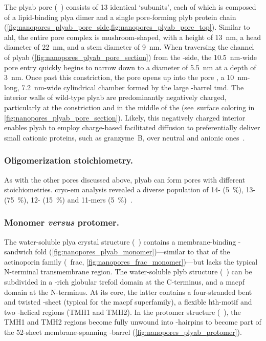 The \gls{plyab} pore (~\cite{Lukoyanova-Kondos-2015}) consists of 13 identical `subunits', each of
which is composed of a lipid-binding \gls{plya} dimer and a single pore-forming \gls{plyb} protein chain
(\cref{fig:nanopores_plyab_pore_side,fig:nanopores_plyab_pore_top}). Similar to \gls{ahl}, the entire pore
complex is mushroom-shaped, with a height of \SI{13}{\nm}, a head diameter of \SI{22}{\nm}, and a stem
diameter of \SI{9}{\nm}. When traversing the channel of \gls{plyab} (\cref{fig:nanopores_plyab_pore_section})
from the \cisi{}-side, the \SI{10.5}{\nm}-wide pore entry quickly begins to narrow down to a diameter of
\SI{5.5}{\nm} at a depth of \SI{3}{\nm}. Once past this constriction, the pore opens up into the pore
\lumen{}, a \SI{10}{\nm}-long, \SI{7.2}{\nm}-wide cylindrical chamber formed by the large \tb-barrel
\gls{tmd}. The interior walls of wild-type \gls{plyab} are predominantly negatively charged, particularly at
the constriction and in the middle of the \lumen{} (see~surface coloring in
\cref{fig:nanopores_plyab_pore_section}). Likely, this negatively charged interior enables \gls{plyab} to
employ charge-based facilitated diffusion to preferentially deliver small cationic proteins, such as
granzyme~B, over neutral and anionic ones~\cite{Stewart-2014,Reboul-2016}.


\subsubsection{Oligomerization stoichiometry.}
%

As with the other pores discussed above, \gls{plyab} can form pores with different stoichiometries.
\Gls{cryo-em} analysis revealed a diverse population of 14- (\SI{5}{\percent}), 13- (\SI{75}{\percent}), 12-
(\SI{15}{\percent}) and 11-mers (\SI{5}{\percent})~\cite{Lukoyanova-Kondos-2015}.


\subsubsection{Monomer \textit{versus} protomer.}
%

The water-soluble \gls{plya} crystal structure (~\cite{Lukoyanova-Kondos-2015}) contains a
membrane-binding \tb-sandwich fold (\cref{fig:nanopores_plyab_monomer})---similar to that of the actinoporin
family (\eg~\gls{frac}, \cref{fig:nanopores_frac_monomer})---but lacks the typical N-terminal transmembrane
region. The water-soluble \gls{plyb} structure (~\cite{Lukoyanova-Kondos-2015}) can be subdivided
in a \tb-rich globular trefoil domain at the C-terminus, and a \gls{macpf} domain at the N-terminus. At its
core, the latter contains a four-stranded bent and twisted \tb-sheet (typical for the \gls{macpf}
superfamily), a flexible \gls{hth}-motif and two \ta-helical regions ({TMH1} and {TMH2}). In the protomer
structure (~\cite{Lukoyanova-Kondos-2015}), the {TMH1} and {TMH2} regions become fully unwound
into \tb-hairpins to become part of the 52-sheet membrane-spanning \tb-barrel
(\cref{fig:nanopores_plyab_protomer}).


